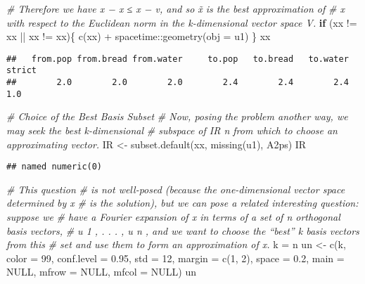 \documentclass[
]{article}
\newenvironment{Shaded}{\begin{snugshade}}{\end{snugshade}}
\newcommand{\AttributeTok}[1]{\textcolor[rgb]{0.77,0.63,0.00}{#1}}
\newcommand{\CommentTok}[1]{\textcolor[rgb]{0.56,0.35,0.01}{\textit{#1}}}
\newcommand{\ConstantTok}[1]{\textcolor[rgb]{0.00,0.00,0.00}{#1}}
\newcommand{\ControlFlowTok}[1]{\textcolor[rgb]{0.13,0.29,0.53}{\textbf{#1}}}
\newcommand{\DecValTok}[1]{\textcolor[rgb]{0.00,0.00,0.81}{#1}}
\newcommand{\FloatTok}[1]{\textcolor[rgb]{0.00,0.00,0.81}{#1}}
\newcommand{\FunctionTok}[1]{\textcolor[rgb]{0.00,0.00,0.00}{#1}}
\newcommand{\NormalTok}[1]{#1}
\newcommand{\OtherTok}[1]{\textcolor[rgb]{0.56,0.35,0.01}{#1}}
\newcommand{\SpecialCharTok}[1]{\textcolor[rgb]{0.00,0.00,0.00}{#1}}
\begin{document}
\begin{Shaded}
\begin{Highlighting}[]
\CommentTok{\# Therefore we have x − x ≤ x − v, and so x̃ is the best approximation of}
\CommentTok{\# x with respect to the Euclidean norm in the k{-}dimensional vector space V.}
\ControlFlowTok{if}\NormalTok{ (xx }\SpecialCharTok{!=}\NormalTok{ xx }\SpecialCharTok{||}\NormalTok{ xx }\SpecialCharTok{!=}\NormalTok{ xx)\{}
    \FunctionTok{c}\NormalTok{(xx) }\SpecialCharTok{+}\NormalTok{ spacetime}\SpecialCharTok{::}\FunctionTok{geometry}\NormalTok{(}\AttributeTok{obj =}\NormalTok{ u1)}
\NormalTok{\}}
\NormalTok{xx}
\end{Highlighting}
\end{Shaded}

\begin{verbatim}
##   from.pop from.bread from.water     to.pop   to.bread   to.water     strict 
##        2.0        2.0        2.0        2.4        2.4        2.4        1.0
\end{verbatim}

\begin{Shaded}
\begin{Highlighting}[]
\CommentTok{\# Choice of the Best Basis Subset}
\CommentTok{\# Now, posing the problem another way, we may seek the best k{-}dimensional}
\CommentTok{\# subspace of IR n from which to choose an approximating vector.}
\NormalTok{IR }\OtherTok{\textless{}{-}} \FunctionTok{subset.default}\NormalTok{(xx, }\FunctionTok{missing}\NormalTok{(u1), A2ps)}
\NormalTok{IR}
\end{Highlighting}
\end{Shaded}

\begin{verbatim}
## named numeric(0)
\end{verbatim}

\begin{Shaded}
\begin{Highlighting}[]
\CommentTok{\# This question}
\CommentTok{\# is not well{-}posed (because the one{-}dimensional vector space determined by x}
\CommentTok{\# is the solution), but we can pose a related interesting question: suppose we}
\CommentTok{\# have a Fourier expansion of x in terms of a set of n orthogonal basis vectors,}
\CommentTok{\# u 1 , . . . , u n , and we want to choose the “best” k basis vectors from this }
\CommentTok{\# set and use them to form an approximation of x.}
\NormalTok{k }\OtherTok{=}\NormalTok{ n}
\NormalTok{un }\OtherTok{\textless{}{-}} \FunctionTok{c}\NormalTok{(k, }\AttributeTok{color =} \DecValTok{99}\NormalTok{, }\AttributeTok{conf.level =} \FloatTok{0.95}\NormalTok{, }
             \AttributeTok{std =} \DecValTok{12}\NormalTok{, }\AttributeTok{margin =} \FunctionTok{c}\NormalTok{(}\DecValTok{1}\NormalTok{, }\DecValTok{2}\NormalTok{),}
             \AttributeTok{space =} \FloatTok{0.2}\NormalTok{, }\AttributeTok{main =} \ConstantTok{NULL}\NormalTok{, }\AttributeTok{mfrow =} \ConstantTok{NULL}\NormalTok{, }\AttributeTok{mfcol =} \ConstantTok{NULL}\NormalTok{)}
\NormalTok{un}
\end{Highlighting}
\end{Shaded}
\end{document}
